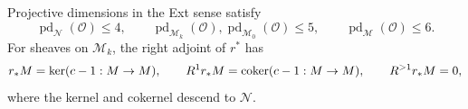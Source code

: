 \begin{proposition}\label{geom:cohomological-bounds}
Projective dimensions in the Ext sense satisfy
\begin{equation}\label{geom:dimension-bounds}
 \operatorname{pd}_{\mathcal N}(\mathcal O)\leq4,\qquad
 \operatorname{pd}_{\mathcal M_k}(\mathcal O),
 \operatorname{pd}_{\mathcal M_0}(\mathcal O)\leq5,\qquad
 \operatorname{pd}_{\mathcal M}(\mathcal O)\leq6.
\end{equation}
For sheaves on $\mathcal M_k$, the right adjoint of $r^*$ has
\begin{equation}\label{geom:central-derived-invariants}
 r_*M=\ker(c-1:M\to M),\qquad
 R^1r_*M=\operatorname{coker}(c-1:M\to M),\qquad R^{>1}r_*M=0,
\end{equation}
where the kernel and cokernel descend to $\mathcal N$.
\end{proposition}


